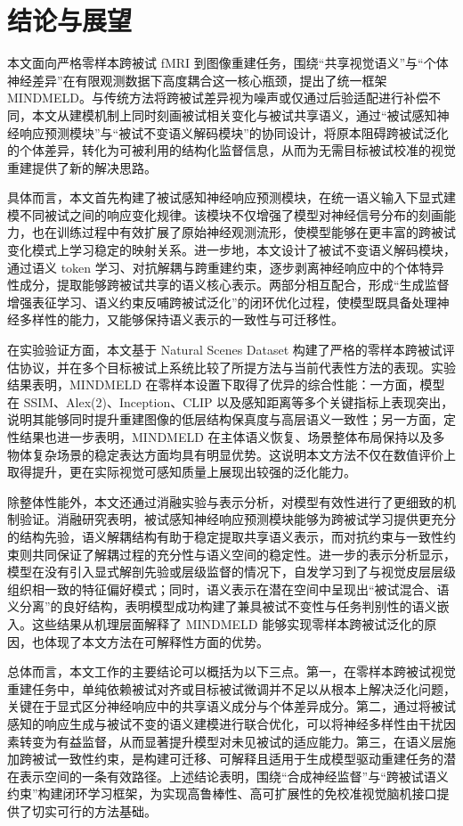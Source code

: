 \chapter{结论与展望}

本文面向严格零样本跨被试 fMRI 到图像重建任务，围绕“共享视觉语义”与“个体神经差异”在有限观测数据下高度耦合这一核心瓶颈，提出了统一框架 MINDMELD。与传统方法将跨被试差异视为噪声或仅通过后验适配进行补偿不同，本文从建模机制上同时刻画被试相关变化与被试共享语义，通过“被试感知神经响应预测模块”与“被试不变语义解码模块”的协同设计，将原本阻碍跨被试泛化的个体差异，转化为可被利用的结构化监督信息，从而为无需目标被试校准的视觉重建提供了新的解决思路。

具体而言，本文首先构建了被试感知神经响应预测模块，在统一语义输入下显式建模不同被试之间的响应变化规律。该模块不仅增强了模型对神经信号分布的刻画能力，也在训练过程中有效扩展了原始神经观测流形，使模型能够在更丰富的跨被试变化模式上学习稳定的映射关系。进一步地，本文设计了被试不变语义解码模块，通过语义 token 学习、对抗解耦与跨重建约束，逐步剥离神经响应中的个体特异性成分，提取能够跨被试共享的语义核心表示。两部分相互配合，形成“生成监督增强表征学习、语义约束反哺跨被试泛化”的闭环优化过程，使模型既具备处理神经多样性的能力，又能够保持语义表示的一致性与可迁移性。

在实验验证方面，本文基于 Natural Scenes Dataset 构建了严格的零样本跨被试评估协议，并在多个目标被试上系统比较了所提方法与当前代表性方法的表现。实验结果表明，MINDMELD 在零样本设置下取得了优异的综合性能：一方面，模型在 SSIM、Alex(2)、Inception、CLIP 以及感知距离等多个关键指标上表现突出，说明其能够同时提升重建图像的低层结构保真度与高层语义一致性；另一方面，定性结果也进一步表明，MINDMELD 在主体语义恢复、场景整体布局保持以及多物体复杂场景的稳定表达方面均具有明显优势。这说明本文方法不仅在数值评价上取得提升，更在实际视觉可感知质量上展现出较强的泛化能力。

除整体性能外，本文还通过消融实验与表示分析，对模型有效性进行了更细致的机制验证。消融研究表明，被试感知神经响应预测模块能够为跨被试学习提供更充分的结构先验，语义解耦结构有助于稳定提取共享语义表示，而对抗约束与一致性约束则共同保证了解耦过程的充分性与语义空间的稳定性。进一步的表示分析显示，模型在没有引入显式解剖先验或层级监督的情况下，自发学习到了与视觉皮层层级组织相一致的特征偏好模式；同时，语义表示在潜在空间中呈现出“被试混合、语义分离”的良好结构，表明模型成功构建了兼具被试不变性与任务判别性的语义嵌入。这些结果从机理层面解释了 MINDMELD 能够实现零样本跨被试泛化的原因，也体现了本文方法在可解释性方面的优势。

总体而言，本文工作的主要结论可以概括为以下三点。第一，在零样本跨被试视觉重建任务中，单纯依赖被试对齐或目标被试微调并不足以从根本上解决泛化问题，关键在于显式区分神经响应中的共享语义成分与个体差异成分。第二，通过将被试感知的响应生成与被试不变的语义建模进行联合优化，可以将神经多样性由干扰因素转变为有益监督，从而显著提升模型对未见被试的适应能力。第三，在语义层施加跨被试一致性约束，是构建可迁移、可解释且适用于生成模型驱动重建任务的潜在表示空间的一条有效路径。上述结论表明，围绕“合成神经监督”与“跨被试语义约束”构建闭环学习框架，为实现高鲁棒性、高可扩展性的免校准视觉脑机接口提供了切实可行的方法基础。

